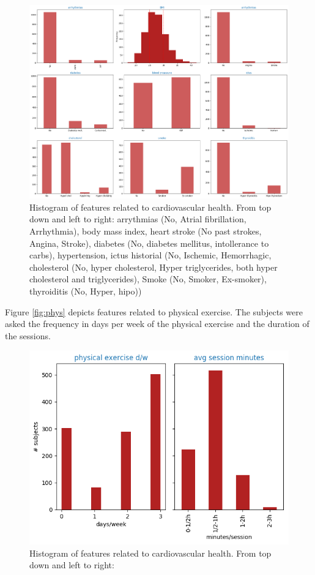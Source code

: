 \documentclass[11pt]{article}
\theoremstyle{definition}
\theoremstyle{remark}
\begin{document}

\begin{figure}[H]
        \centering
        \includegraphics[keepaspectratio, width=0.5\linewidth]{figures/Fig_cardio}
        \caption{Histogram of features related to cardiovascular health. From top down and left to right: arrythmias (No, Atrial fibrillation, Arrhythmia), body mass index, heart stroke (No past strokes, Angina, Stroke), diabetes (No, diabetes mellitus, intollerance to carbs), hypertension, ictus historial (No, Ischemic, Hemorrhagic, cholesterol (No, hyper cholesterol, Hyper triglycerides, both hyper cholesterol and triglycerides), Smoke (No, Smoker, Ex-smoker), thyroiditis (No, Hyper, hipo)) } 
        \label{fig:cardio}
\end{figure}

Figure \ref{fig:phys} depicts features related to physical exercise. The subjects were asked the frequency in days per week of the physical exercise and the duration of the sessions.
\begin{figure}[H]
        \centering
        \includegraphics[keepaspectratio, width=0.5\linewidth]{figures/Fig_phys}
        \caption{Histogram of features related to cardiovascular health. From top down and left to right:  } 
        \label{fig:cardio}
\end{figure}
\end{document}
